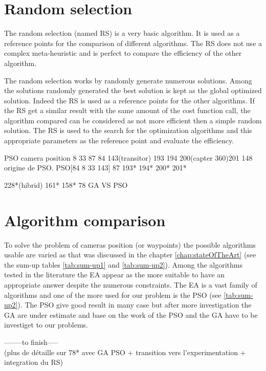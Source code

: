 \section{Random selection }

The random selection (named RS) is a very basic algorithm. It is used as a reference points for the comparison of different algorithms. The RS does not use a complex meta-heuristic and is perfect to compare the efficiency of the other algorithm.

The random selection works by randomly generate numerous solutions. Among the solutions randomly generated the best solution is kept as the global optimized solution.
Indeed the RS is used as a reference points for the other algorithms. If  the RS get a similar result with the same amount of the cost function call, the algorithm compared can be considered as not more efficient then a simple random solution. 
The RS is used to the search for the optimization algorithms and this appropriate parameters as the reference point and evaluate the efficiency.


  

PSO camera position 
8 33 87 84 143(transitor) 193 194 200(capter 360)201
148 origine de PSO. 
PSO[84 8 33 143] 87 193* 194* 200* 201* 

228*(hibrid) 161* 158* 78 GA VS PSO

\section{Algorithm comparison }\label{sec:GAvsPSO} 
%
To solve the problem of cameras  position (or waypoints) the possible algorithms usable are varied as that was discussed in the chapter \ref{chap:stateOfTheArt} (see the sum-up tables \ref{tab:sum-up1} and \ref{tab:sum-up2}).
Among the algorithms tested in the literature the EA appear as the more suitable to have an appropriate answer despite the numerous constraints. The EA is a vast family of algorithms and one of the more used for our problem is the PSO (see \ref{tab:sum-up2}). The PSO give good result in many case but after more investigation the GA are under estimate and base on the work of \citep{78*boeringer2004}  the PSO and the GA have to be investiget to our problems. 

--------to finish-----\\ (plus de détaille sur 78* avec GA PSO + transition vers  l'experimentation + integration du RS)\\

